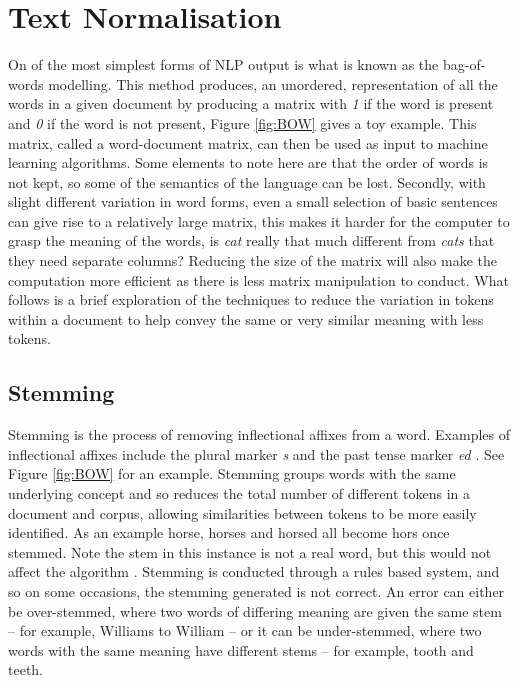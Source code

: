 \section{Text Normalisation} On of the most simplest forms of NLP output is what is known as the bag-of-words modelling. This method produces, an unordered, representation of all the words in a given document by producing a matrix with \emph{1} if the word is present and \emph{0} if the word is not present, Figure \ref{fig:BOW} gives a toy example. This matrix, called a word-document matrix, can then be used as input to machine learning algorithms. Some elements to note here are that the order of words is not kept, so some of the semantics of the language can be lost. Secondly, with slight different variation in word forms, even a small selection of basic sentences can give rise to a relatively large matrix, this makes it harder for the computer to grasp the meaning of the words, is \emph{cat} really that much different from \emph{cats} that they need separate columns? Reducing the size of the matrix will also make the computation more efficient as there is less matrix manipulation to conduct. What follows is a brief exploration of the techniques to reduce the variation in tokens within a document to help convey the same or very similar meaning with less tokens.

\subsection{Stemming} Stemming is the process of removing inflectional affixes from a word. Examples of inflectional affixes include the plural marker \emph{s} and the past tense marker \emph{ed} \parencite{eisenstein2018natural}. See Figure \ref{fig:BOW} for an example. Stemming groups words with the same underlying concept and so reduces the total number of different tokens in a document and corpus, allowing similarities between tokens to be more easily identified. As an example horse, horses and horsed all become hors once stemmed. Note the stem in this instance is not a real word, but this would not affect the algorithm \parencite{jivani2011comparative}. Stemming is conducted through a rules based system, and so on some occasions, the stemming generated is not correct.  An error can either be over-stemmed, where two words of differing meaning are given the same stem – for example, Williams to William – or it can be under-stemmed, where two words with the same meaning have different stems – for example, tooth and teeth.

